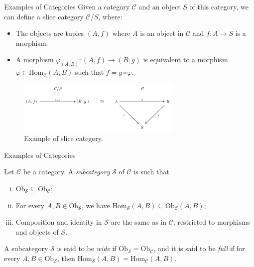 \documentclass[aspectratio=169,xcolor=dvipsnames,10pt]{beamer}
\theoremstyle{definition}
\begin{document}
\begin{frame}[fragile]{Examples of Categories}
        Given a category \(\mathcal{C}\) and an object \(S\) of this category, we can define a slice category \(\mathcal{C} / S\), where:
        \begin{itemize}
            \item The objects are tuples \((A, f)\) where \(A\) is an object in \(\mathcal{C}\) and \(f: A \to S\) is a morphism.
            \item A morphism \(\varphi_{(A, B)} : (A, f) \to (B, g)\) is equivalent to a morphism \(\varphi \in \text{Hom}_{\mathcal{C}}(A, B)\) such that \(f = g \circ \varphi\).
        \end{itemize}
	\begin{figure}[H]
		\begin{center}
			\includegraphics[width=0.70\textwidth]{./figs/SliceCategory.pdf}
		\end{center}
		\caption{Example of slice category.}
		\label{fig:slice}
	\end{figure}
\end{frame}

\begin{frame}[fragile]{Examples of Categories}
    \begin{definition}[Subcategory]
        Let $\mathcal C$ be a category. A \textit{subcategory} $\mathcal S$ of $\mathcal C$ is such that
        \begin{enumerate}[(i)]
            \item $\text{Ob}_\mathcal S \subseteq \text{Ob}_\mathcal C$;
            \item For every $A,B \in \text{Ob}_\mathcal S$, we have $\text{Hom}_\mathcal S(A,B) \subseteq \text{Ob}_\mathcal C(A,B)$;
            \item Composition and identity in $\mathcal S$ are the same as in $\mathcal C$, restricted to morphisms and objects of $\mathcal S$.
        \end{enumerate}

        A subcategory $\mathcal S$ is said to be \textit{wide} if $\text{Ob}_\mathcal S = \text{Ob}_\mathcal C$,
        and it is said to be \textit{full} if for every $A,B \in \text{Ob}_\mathcal S$, then 
        $\text{Hom}_\mathcal S(A,B) = \text{Hom}_\mathcal C(A,B)$.
    \end{definition}
\end{frame}
\end{document}
